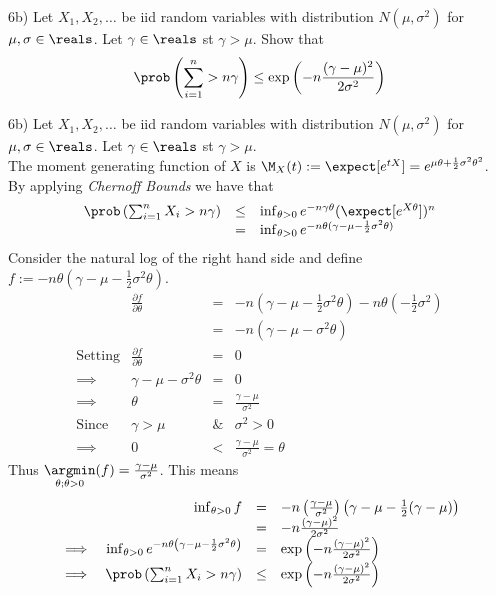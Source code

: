 \documentclass[11pt,a4paper]{article}
\begin{document}
\begin{question}{6b)}
  Let $X_1,X_2,\dots$ be iid random variables with distribution $N(\mu,\sigma^2)$ for $\mu,\sigma\in\reals$. Let $\gamma\in\reals$ st $\gamma>\mu$. Show that
  \[ \prob\left(\sum_{i=1}^n>n\gamma\right)\leq\exp\left(-n\frac{(\gamma-\mu)^2}{2\sigma^2}\right) \]
\end{question}

\begin{answer}{6b)}
  Let $X_1,X_2,\dots$ be iid random variables with distribution $N(\mu,\sigma^2)$ for $\mu,\sigma\in\reals$. Let $\gamma\in\reals$ st $\gamma>\mu$.\\
  The moment generating function of $X$ is $\M_X(t):=\expect[e^{tX}]=e^{\mu\theta+\frac12\sigma^2\theta^2}$.\\
  By applying \textit{Chernoff Bounds} we have that
  \[\begin{array}{rcl}
  \prob\left(\sum_{i=1}^nX_i>n\gamma\right)&\leq&\inf_{\theta>0}e^{-n\gamma\theta}(\expect[e^{X\theta}])^n\\
  &=&\inf_{\theta>0}e^{-n\theta(\gamma-\mu-\frac12\sigma^2\theta)}
  \end{array}\]
  Consider the natural log of the right hand side and define $f:=-n\theta(\gamma-\mu-\frac12\sigma^2\theta)$.
  \[\begin{array}{rrcl}
    &\frac{\partial f}{\partial\theta}&=&-n(\gamma-\mu-\frac12\sigma^2\theta)-n\theta(-\frac12\sigma^2)\\
    &&=&-n(\gamma-\mu-\sigma^2\theta)\\
    \text{Setting}&\frac{\partial f}{\partial\theta}&=&0\\
    \implies&\gamma-\mu-\sigma^2\theta&=&0\\
    \implies&\theta&=&\frac{\gamma-\mu}{\sigma^2}\\
    \text{Since}&\gamma>\mu&\&&\sigma^2>0\\
    \implies&0&<&\frac{\gamma-\mu}{\sigma^2}=\theta
  \end{array}\]
  Thus $\underset{\theta;\theta>0}\argmin(f)=\frac{\gamma-\mu}{\sigma^2}$. This means
  \[\begin{array}{rrcl}
    &\inf_{\theta>0}f&=&-n\left(\frac{\gamma-\mu}{\sigma^2}\right)\left(\gamma-\mu-\frac12(\gamma-\mu)\right)\\
    &&=&-n\frac{(\gamma-\mu)^2}{2\sigma^2}\\
    \implies&\inf_{\theta>0}e^{-n\theta\left(\gamma-\mu-\frac12\sigma^2\theta\right)}&=&\exp\left(-n\frac{(\gamma-\mu)^2}{2\sigma^2}\right)\\
    \implies&\prob\left(\sum_{i=1}^nX_i>n\gamma\right)&\leq&\exp\left(-n\frac{(\gamma-\mu)^2}{2\sigma^2}\right)
  \end{array}\]
\end{answer}
\end{document}
